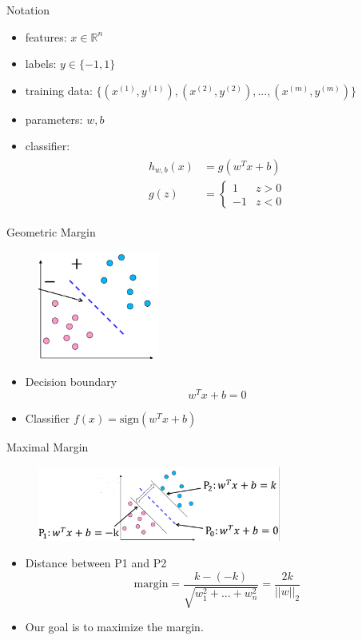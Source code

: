 \documentclass{beamer}
\begin{document}
\begin{frame}{Notation}
\begin{itemize}
\item features: $x \in \mathbb{R}^n$
\item labels: $y\in \{-1, 1\}$
\item training data: $\{(x^{(1)}, y^{(1)}),(x^{(2)}, y^{(2)}),...,(x^{(m)}, y^{(m)})\}$
\item parameters: $w, b$
\item classifier:
\begin{align}
\begin{split}
h_{w, b}(x) &= g(w^Tx + b)\\
g(z) &=
  \begin{cases}
    1       & z > 0\\
    -1  & z < 0
  \end{cases}
\end{split}
\end{align}

\end{itemize}
\end{frame}

\begin{frame}{Geometric Margin}
\begin{figure}
\includegraphics[width=4cm]{images/img3.png}
\end{figure}
\begin{itemize}
\item Decision boundary
\begin{equation}
w^Tx + b = 0
\end{equation}
\item Classifier $f(x) = \text{sign}(w^Tx+b)$
\end{itemize}
\end{frame}

\begin{frame}{Maximal Margin}
\begin{figure}
\includegraphics[width=8cm]{images/img4.png}
\end{figure}
\begin{itemize}
\item Distance between P1 and P2
\begin{equation}
\text{margin} = \frac{k-(-k)}{\sqrt{w_1^2+...+w_n^2}}=\frac{2k}{||w||_2}
\end{equation}
\item Our goal is to maximize the margin.
\end{itemize}
\end{frame}
\end{document}
